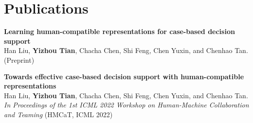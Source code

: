 
\section{Publications}



\textbf{Learning human-compatible representations for case-based decision support}
\href{https://drive.google.com/file/d/1Jo_UxAb69B-v5oqET8-qjzQIvDsXt-fF/view}
{\faExternalLink}\\
Han Liu, \textbf{Yizhou Tian}, Chacha Chen, Shi Feng, Chen Yuxin, and Chenhao Tan. (Preprint)
\vspace{1mm}
        

\textbf{Towards effective case-based decision support with human-compatible representations} 
\href{https://drive.google.com/file/d/1Jo_UxAb69B-v5oqET8-qjzQIvDsXt-fF/view}
{\faExternalLink}\\
Han Liu, \textbf{Yizhou Tian}, Chacha Chen, Shi Feng, Chen Yuxin, and Chenhao Tan. \textit{In Proceedings of the 1st ICML 2022 Workshop on Human-Machine Collaboration and Teaming} (HMCaT, ICML 2022) 
\vspace{1mm}
